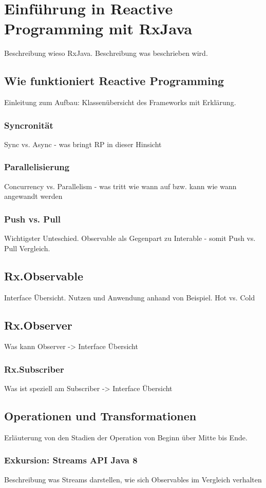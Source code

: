 \chapter{Einführung in Reactive Programming mit RxJava}\label{rp_einfuehrung}
Beschreibung wieso RxJava. Beschreibung was beschrieben wird.
\section{Wie funktioniert Reactive Programming}
Einleitung zum Aufbau: Klassenübersicht des Frameworks mit Erklärung. 
\subsection{Syncronität}
Sync vs. Async - was bringt RP in dieser Hinsicht
\subsection{Parallelisierung}
Concurrency vs. Parallelism - was tritt wie wann auf bzw. kann wie wann angewandt werden
\subsection{Push vs. Pull}
Wichtigster Unteschied. Observable als Gegenpart zu Interable - somit Push vs. Pull Vergleich.
\section{Rx.Observable}
Interface Übersicht. Nutzen und Anwendung anhand von Beispiel. Hot vs. Cold
\section{Rx.Observer}
Was kann Observer -> Interface Übersicht
\subsection{Rx.Subscriber}
Was ist speziell am Subscriber -> Interface Übersicht
\section{Operationen und Transformationen}
Erläuterung von den Stadien der Operation von Beginn über Mitte bis Ende.
\subsection{Exkursion: Streams API Java 8}
Beschreibung was Streams darstellen, wie sich Observables im Vergleich verhalten
